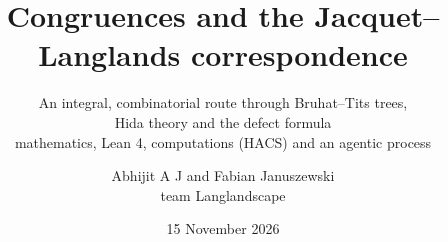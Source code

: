 \documentclass[aspectratio=169]{beamer}
\title{Congruences and the Jacquet--Langlands correspondence}
\subtitle{An integral, combinatorial route through Bruhat--Tits trees,\\ Hida theory and the defect formula\\
  mathematics, Lean 4, computations (HACS) and an agentic process}
\author{Abhijit A J and Fabian Januszewski\\[0.3ex] team Langlandscape}
\institute{Caltech $\times$ SAIR Mathathon 2026}
\date{15 November 2026}
\begin{document}
\begin{frame}
  \titlepage
\end{frame}















\appendix










\end{document}
